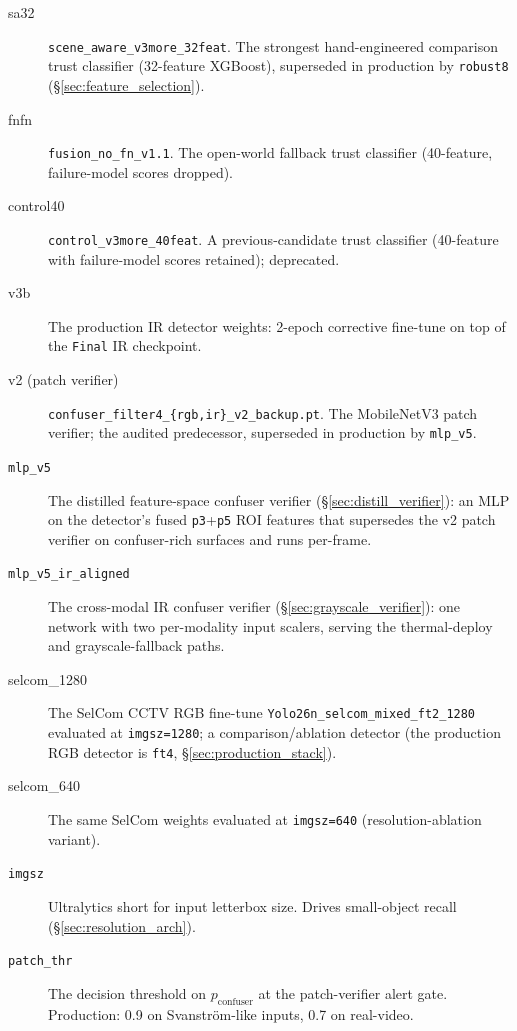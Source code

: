 \begin{description}
    \item[sa32] \texttt{scene\_aware\_v3more\_32feat}. The strongest hand-engineered comparison trust classifier (32-feature XGBoost), superseded in production by \texttt{robust8} (\S\ref{sec:feature_selection}).
    \item[fnfn] \texttt{fusion\_no\_fn\_v1.1}. The open-world fallback trust classifier (40-feature, failure-model scores dropped).
    \item[control40] \texttt{control\_v3more\_40feat}. A previous-candidate trust classifier (40-feature with failure-model scores retained); deprecated.
    \item[v3b] The production IR detector weights: 2-epoch corrective fine-tune on top of the \texttt{Final} IR checkpoint.
    \item[v2 (patch verifier)] \texttt{confuser\_filter4\_\{rgb,ir\}\_v2\_backup.pt}. The MobileNetV3 patch verifier; the audited predecessor, superseded in production by \texttt{mlp\_v5}.
    \item[\texttt{mlp\_v5}] The distilled feature-space confuser verifier (\S\ref{sec:distill_verifier}): an MLP on the detector's fused \texttt{p3}+\texttt{p5} ROI features that supersedes the v2 patch verifier on confuser-rich surfaces and runs per-frame.
    \item[\texttt{mlp\_v5\_ir\_aligned}] The cross-modal IR confuser verifier (\S\ref{sec:grayscale_verifier}): one network with two per-modality input scalers, serving the thermal-deploy and grayscale-fallback paths.
    \item[selcom\_1280] The SelCom CCTV RGB fine-tune \texttt{Yolo26n\_selcom\_mixed\_ft2\_1280} evaluated at \texttt{imgsz=1280}; a comparison/ablation detector (the production RGB detector is \texttt{ft4}, \S\ref{sec:production_stack}).
    \item[selcom\_640] The same SelCom weights evaluated at \texttt{imgsz=640} (resolution-ablation variant).
    \item[\texttt{imgsz}] Ultralytics short for input letterbox size. Drives small-object recall (\S\ref{sec:resolution_arch}).
    \item[\texttt{patch\_thr}] The decision threshold on $p_\text{confuser}$ at the patch-verifier alert gate. Production: 0.9 on Svanstr\"om-like inputs, 0.7 on real-video.
\end{description}
